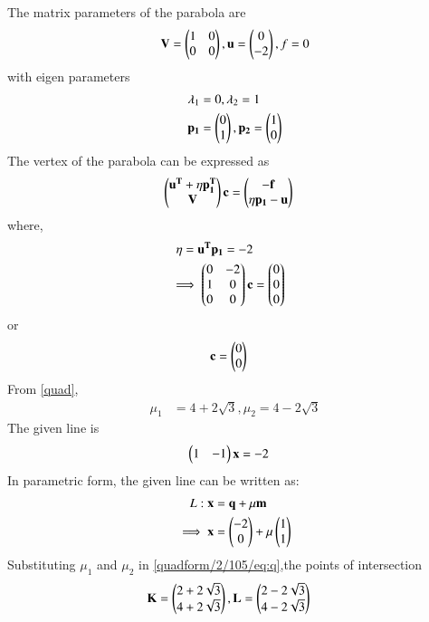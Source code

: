 \documentclass[journal,12pt,twocolumn]{IEEEtran}
\begin{document}
 The matrix parameters of the parabola are
\begin{align}
\mathbf{V}=\begin{pmatrix}1&0\\0&0\end{pmatrix},\mathbf{u}=\begin{pmatrix}0\\-2\end{pmatrix},f=0 \label{quadform/2/105/eq:v}
\end{align}
with eigen parameters 
\begin{align}
\lambda_1 &= 0 , \lambda_2 = 1
\\
\mathbf{p_1} &= \begin{pmatrix}0 \\ 1\end{pmatrix},
\mathbf{p_2} = \begin{pmatrix}1 \\ 0\end{pmatrix}
\end{align}
The vertex of the parabola can be expressed as
\begin{align} \begin{pmatrix}\mathbf{u^T}+\eta\mathbf{p_1^T}\\\mathbf{V} \end{pmatrix}\mathbf{c} &= \begin{pmatrix}\mathbf{-f}\\\eta \mathbf{p_1} -\mathbf{u}\end{pmatrix}
\end{align}
where, 
\begin{align}\eta = \mathbf{u^T}\mathbf{p_1} = -2
\\
\implies\begin{pmatrix}0 & -2\\1 & 0 \\0 & 0\end{pmatrix} \mathbf{c}&= \begin{pmatrix}0\\0\\0\end{pmatrix}
\end{align}
or
\begin{align}
   \mathbf{c} &= \begin{pmatrix}0 \\ 0\end{pmatrix}
\end{align}
From  \eqref{quad},
\begin{align}
\mu_1 &= 4+2\sqrt{3}, \mu_2 =4-2\sqrt{3}
\end{align}
The given line is
\begin{align} 
\begin{pmatrix}1&-1\end{pmatrix}\mathbf{x}&=-2
\end{align}
 In parametric form, the given  line can be written as:
\begin{align} 
L: \mathbf{x}&=\mathbf{q}+\mu\mathbf{m}
\\
\implies \mathbf{x}&=\begin{pmatrix}-2\\0\end{pmatrix}+\mu\begin{pmatrix}1\\1\end{pmatrix} \label{quadform/2/105/eq:q}
\end{align}
Substituting $\mu_1$ and $\mu_2$ in \eqref{quadform/2/105/eq:q},the points of intersection
\begin{align}
 \mathbf{K}= \begin{pmatrix}2+2\sqrt{3}\\4+2\sqrt{3}\end{pmatrix},  
\mathbf{L}&= \begin{pmatrix}2-2\sqrt{3}\\4-2\sqrt{3}\end{pmatrix}
\end{align}
\end{document}

